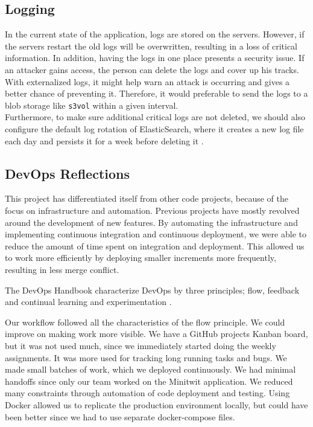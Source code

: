 \documentclass{article}
\begin{document}
\subsection{Logging}
In the current state of the application, logs are stored on the servers. However, if the servers restart the old logs will be overwritten, resulting in a loss of critical information. In addition, having the logs in one place presents a security issue. If an attacker gains access, the person can delete the logs and cover up his tracks. With externalized logs, it might help warn an attack is occurring and gives a better chance of preventing it. Therefore, it would preferable to send the logs to a blob storage like \texttt{s3vol} within a given interval. 
\\
Furthermore, to make sure additional critical logs are not deleted, we should also configure the default log rotation of ElasticSearch, where it creates a new log file each day and persists it for a week before deleting it \cite{elastic-log-rotation}. 

\subsection{DevOps Reflections}
This project has differentiated itself from other code projects, because of the focus on infrastructure and automation. Previous projects have mostly revolved around the development of new features. By automating the infrastructure and implementing continuous integration and continuous deployment, we were able to reduce the amount of time spent on integration and deployment. This allowed us to work more efficiently by deploying smaller increments more frequently, resulting in less merge conflict.

The DevOps Handbook characterize DevOps by three principles; flow, feedback and continual learning and experimentation \cite[Ch. 1-4]{Kim2016-st}. 

Our workflow followed all the characteristics of the flow principle. We could improve on making work more visible. We have a GitHub projects Kanban board, but it was not used much, since we immediately started doing the weekly assignments. It was more used for tracking long running tasks and bugs. We made small batches of work, which we deployed continuously. We had minimal handoffs since only our team worked on the Minitwit application. We reduced many constraints through automation of code deployment and testing. Using Docker allowed us to replicate the production environment locally, but could have been better since we had to use separate docker-compose files. 
\end{document}
